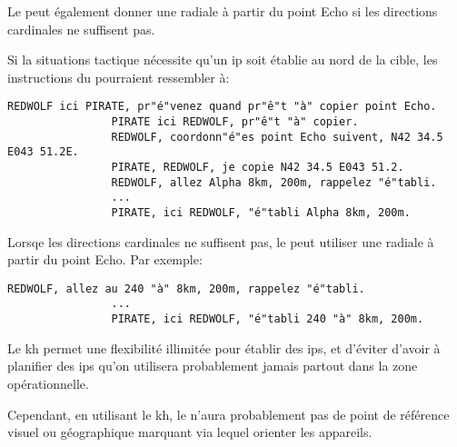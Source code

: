 \begin{e1}
\begin{e2}
\begin{e3}
			Le \ja{} peut également donner une radiale à partir du point Echo si les directions cardinales ne suffisent pas.
			
			
			\begin{e4}
				
				\begin{minipage}{\linewidth}
				\item Si la situations tactique nécessite qu'un \gls{ip} soit établie au nord de la cible, les instructions du \ja{} pourraient ressembler à:
				
				\begin{lstlisting}[caption=Keyhole: directions cardinale, label=keyholecard]
				REDWOLF ici PIRATE, pr"é"venez quand pr"ê"t "à" copier point Echo.
				PIRATE ici REDWOLF, pr"ê"t "à" copier.
				REDWOLF, coordonn"é"es point Echo suivent, N42 34.5 E043 51.2E.
				PIRATE, REDWOLF, je copie N42 34.5 E043 51.2.
				REDWOLF, allez Alpha 8km, 200m, rappelez "é"tabli.
				...
				PIRATE, ici REDWOLF, "é"tabli Alpha 8km, 200m.
				\end{lstlisting}
				\end{minipage}
				
				\begin{minipage}{\linewidth}
				\item Lorsqe les directions cardinales ne suffisent pas, le \ja{} peut utiliser une radiale à partir du point Echo. Par exemple:
				
				\begin{lstlisting}[caption=Keyhole: radiale, label=keyholerad]
				REDWOLF, allez au 240 "à" 8km, 200m, rappelez "é"tabli.
				...
				PIRATE, ici REDWOLF, "é"tabli 240 "à" 8km, 200m.
				\end{lstlisting}
				\end{minipage}
				
			\end{e4}
			
			
			\item Le \gls{kh} permet une flexibilité illimitée pour établir des \glspl{ip}, et d'éviter d'avoir à planifier des \glspl{ip} qu'on utilisera probablement jamais partout dans la zone opérationnelle.
			
			Cependant, en utilisant le \gls{kh}, le \ja{} n'aura probablement pas de point de référence visuel ou géographique marquant via lequel orienter les appareils.
			

\end{e3}
\end{e2}
\end{e1}
